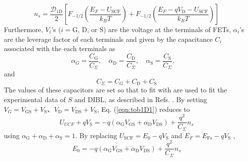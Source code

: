 \documentclass[11pt,uplatex,a4paper]{jsarticle}
\begin{document}
\begin{equation}
 n_s = \frac{\mathcal{D}_{\mathrm{1D}}}{2}
  \left[
   F_{-1/2}(\frac{E_F - U_{\mathrm{SCF}}}{k_B T})+
   F_{-1/2}(\frac{E_F -q V_{\mathrm{D}}- U_{\mathrm{SCF}}}{k_B T})
										 \right]
  \label{eqn:1degdens}
\end{equation}
Furthermore, $V_i$'s ($i=\mathrm{G}$, $\mathrm{D}$, or $\mathrm{S}$) are the
voltage at the terminals of FETs, 
$\alpha_i$'s are the leverage factor of each terminals and given by the capacitance $C_{i}$ associated with the each terminals as
\begin{equation}
 \alpha_{G} = \frac{C_{\mathrm{G}}}{C_{\Sigma}}, \quad
  \alpha_{\mathrm{D}} = \frac{C_{\mathrm{D}}}{C_{\Sigma}}, \quad
   \alpha_{\mathrm{S}} = \frac{C_{\mathrm{S}}}{C_{\Sigma}}, \quad
\end{equation}
and
\begin{equation}
 C_{\Sigma} = C_{G} + C_{\mathrm{D}} + C_{\mathrm{S}}
\end{equation}
The values of these capacitors are set so that to fit with are used to fit the experimental data of $S$ and DIBL, 
as described in Refs. \cite{Rahman:2003ug,Liang:2007uh}.
By setting $V_{G}=V_{\mathrm{GS}}+V_{\mathrm{S}}$、$V_{\mathrm{D}}=V_{\mathrm{DS}}+V_{\mathrm{S}}$, Eq. (\ref{eqn:tob1D1}) reduces to
\begin{equation}
 U_{UCF} + q V_{\mathrm{S}} = -q(\alpha_{\mathrm{G}} V_{\mathrm{GS}} + \alpha_{\mathrm{D}} V_{\mathrm{DS}}) + \frac{q^2}{C_{\Sigma}} n_s
\end{equation}
using $\alpha_{\mathrm{G}} + \alpha_{\mathrm{D}} + \alpha_{\mathrm{S}} =1$. 
By replacing $U_{\mathrm{SCF}} = E_0 - q V_{\mathrm{S}}$ and $E_F =E_{\mathrm{Fs}}-  q V_{\mathrm{S}}$ , 
\begin{equation}
 E_{0} = -q(\alpha_{\mathrm{G}} V_{\mathrm{GS}} + \alpha_{\mathrm{D}} V_{\mathrm{DS}}) + \frac{q^2}{C_{\Sigma}} n_s
  \label{eqn:TOB}
\end{equation}
\end{document}
